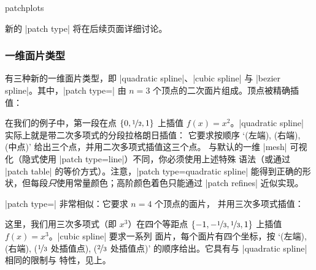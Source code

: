 {\begin{pgfplotslibrary}{patchplots}
\begin{pgfplotskey}
    新的 |patch type| 将在后续页面详细讨论。
\end{pgfplotskey} %


\subsubsection{一维面片类型}

有三种新的一维面片类型，即 |quadratic spline|、|cubic spline| 与
|bezier spline|。其中，|patch type=| 由 $n=3$
个顶点的二次面片组成。顶点被精确插值：
%
\begin{codeexample}[]
\end{codeexample}
%
\noindent 在我们的例子中，第一段在点 $\{0,\nicefrac12,1\}$ 上插值
$f(x)=x^2$。|quadratic spline| 实际上就是带二次多项式的分段拉格朗日插值：
它要求按顺序 `(左端), (右端), (中点)' 给出三个点，并用二次多项式插值这三个点。
与默认的一维 |mesh| 可视化（隐式使用 |patch type=line|）不同，你必须使用上述特殊
语法（或通过 |patch table| 的等价方式）。注意，|patch type=quadratic spline|
能得到正确的形状，但每段\emph{只}使用常量颜色；高阶颜色着色只能通过
|patch refines| 近似实现。

|patch type=| 非常相似：它要求 $n=4$ 个顶点的面片，
并用三次多项式插值：
%
\begin{codeexample}[]
\end{codeexample}
%
\noindent 这里，我们用三次多项式（即 $x^3$）在四个等距点
$\{-1,-\nicefrac13,\nicefrac13,1\}$ 上插值 $f(x)=x^3$。|cubic spline| 要求一系列
面片，每个面片有四个坐标，按 `(左端), (右端), ($\nicefrac13$ 处插值点),
($\nicefrac23$ 处插值点)' 的顺序给出。它具有与 |quadratic spline| 相同的限制与
特性，见上。


\end{pgfplotslibrary}}

